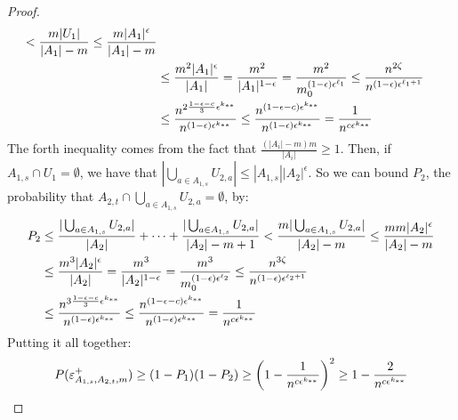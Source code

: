 \begin{lemma}[Claim 4.13]
\begin{proof}
\[\begin{split}
                            < \frac{m |U_1|}{|A_1| - m}
                            \leq \frac{m |A_1|^\epsilon}{|A_1| - m} \\
                        & \leq \frac{m^2 |A_1|^\epsilon}{|A_1|}
                            = \frac{m^2}{|A_1|^{1-\epsilon}}
                            = \frac{m^2}{m_0^{\parround{1-\epsilon} \epsilon^{\ell_1}}} %
                            \leq \frac{n^{2 \zeta}}{n^{(1-\epsilon)\epsilon^{\ell_1 + 1}}} \\
                        & \leq \frac{n^{2\frac{1-\epsilon-c}{3} \epsilon^{k_{**}}}}{n^{(1-\epsilon)\epsilon^{k_{**}}}}
                            \leq \frac{n^{(1-\epsilon-c) \epsilon^{k_{**}}}}{n^{(1-\epsilon)\epsilon^{k_{**}}}}
                            = \frac{1}{n^{c \epsilon^{k_{**}}}}
                \end{split}
            \]
            The forth inequality comes from the fact that $\frac{(|A_i| - m) m}{|A_i|} \geq 1$.
            Then, if $A_{1,s} \cap U_1= \emptyset$, we have that $|\bigcup_{a \in A_{1,s}} U_{2,a}| \leq |A_{1,s}| |A_2|^\epsilon$.
            So we can bound $P_2$, the probability that $A_{2,t} \cap \bigcup_{a \in A_{1,s}} U_{2,a} = \emptyset$, by:
            \[
                \begin{split}
                    P_2
                        & \leq \frac{|\bigcup_{a \in A_{1,s}} U_{2,a}|}{|A_2|} + \dots + \frac{|\bigcup_{a \in A_{1,s}} U_{2,a}|}{|A_2|-m+1}
                            < \frac{m |\bigcup_{a \in A_{1,s}} U_{2,a}|}{|A_2| - m}
                            \leq \frac{m m |A_2|^\epsilon}{|A_2| - m} \\
                        & \leq \frac{m^3 |A_2|^\epsilon}{|A_2|}
                            = \frac{m^3}{|A_2|^{1-\epsilon}}
                            = \frac{m^3}{m_0^{\parround{1-\epsilon} \epsilon^{\ell_2}}} %
                            \leq \frac{n^{3 \zeta}}{n^{(1-\epsilon)\epsilon^{\ell_2 + 1}}} \\
                        & \leq \frac{n^{3\frac{1-\epsilon-c}{3} \epsilon^{k_{**}}}}{n^{(1-\epsilon)\epsilon^{k_{**}}}}
                            \leq \frac{n^{(1-\epsilon-c) \epsilon^{k_{**}}}}{n^{(1-\epsilon)\epsilon^{k_{**}}}}
                            = \frac{1}{n^{c \epsilon^{k_{**}}}}
                \end{split}
            \]
            Putting it all together:
            \[
                P(\varepsilon^+_{A_{1,s},A_{2,t},m})
                    \geq (1 - P_1) (1 - P_2)
                    \geq \left( 1 - \frac{1}{n^{c \epsilon^{k_{**}}}} \right)^2
                    \geq 1 - \frac{2}{n^{c\epsilon^{k_{**}}}}
            \]
        \end{proof}
    \end{lemma}

